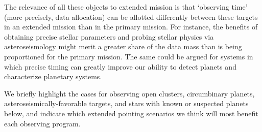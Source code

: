 The relevance of all these objects to \tesss extended mission is that `observing time' (more precisely, data allocation) can be allotted differently between these targets in an extended mission than in the primary mission.
For instance, the benefits of obtaining precise stellar parameters and probing stellar physics via asteroseismology might merit a greater share of the data mass than is being proportioned for the primary mission.
The same could be argued for systems in which precise timing can greatly improve our ability to detect planets and characterize planetary systems.

We briefly highlight the cases for observing open clusters, circumbinary planets, asteroseismically-favorable targets, and stars with known or suspected planets below, and indicate which extended pointing scenarios we think will most benefit each observing program.


